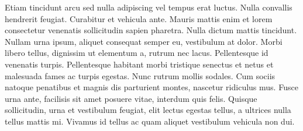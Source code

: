 Etiam tincidunt arcu sed nulla adipiscing vel tempus erat luctus. Nulla
convallis hendrerit feugiat. Curabitur et vehicula ante. Mauris mattis enim
et lorem consectetur venenatis sollicitudin sapien pharetra. Nulla dictum
mattis tincidunt. Nullam urna ipsum, aliquet consequat semper eu, vestibulum
at dolor. Morbi libero tellus, dignissim ut elementum a, rutrum nec lacus.
Pellentesque id venenatis turpis. Pellentesque habitant morbi tristique
senectus et netus et malesuada fames ac turpis egestas. Nunc rutrum mollis
sodales. Cum sociis natoque penatibus et magnis dis parturient montes,
nascetur ridiculus mus. Fusce urna ante, facilisis sit amet posuere vitae,
interdum quis felis. Quisque sollicitudin, urna et vestibulum feugiat, elit
lectus egestas tellus, a ultrices nulla tellus mattis mi. Vivamus id tellus
ac quam aliquet vestibulum vehicula non dui.

